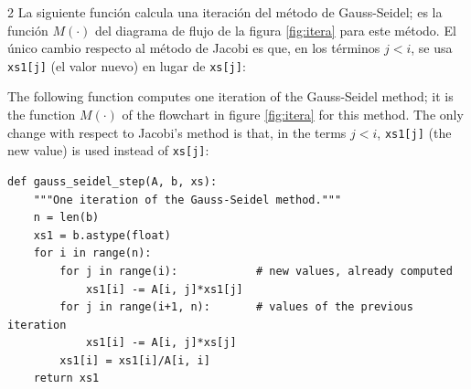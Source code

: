 \begin{paracol}{2}
La siguiente función calcula una iteración del método de Gauss-Seidel; es la función $M(\cdot)$ del diagrama de flujo de la figura \ref{fig:itera} para este método. El único cambio respecto al método de Jacobi es que, en los términos $j<i$, se usa \texttt{xs1[j]} (el valor nuevo) en lugar de \texttt{xs[j]}:

\switchcolumn
The following function computes one iteration of the Gauss-Seidel method; it is the function $M(\cdot)$ of the flowchart in figure \ref{fig:itera} for this method. The only change with respect to Jacobi's method is that, in the terms $j<i$, \texttt{xs1[j]} (the new value) is used instead of \texttt{xs[j]}:
\end{paracol}
\begin{verbatim}
def gauss_seidel_step(A, b, xs):
    """One iteration of the Gauss-Seidel method."""
    n = len(b)
    xs1 = b.astype(float)
    for i in range(n):
        for j in range(i):            # new values, already computed
            xs1[i] -= A[i, j]*xs1[j]
        for j in range(i+1, n):       # values of the previous iteration
            xs1[i] -= A[i, j]*xs[j]
        xs1[i] = xs1[i]/A[i, i]
    return xs1
\end{verbatim}

